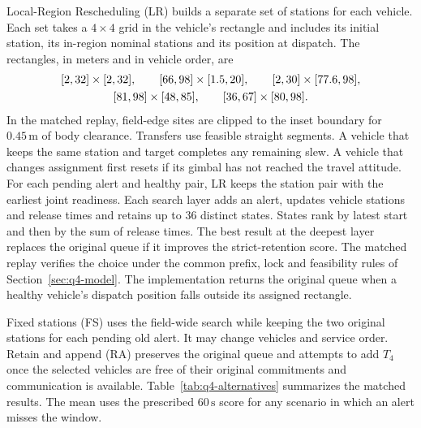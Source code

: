 \documentclass{swmcmthesis}
\begin{document}
Local-Region Rescheduling (LR) builds a separate set of stations for each vehicle. Each set takes a \(4\times4\) grid in the vehicle's rectangle and includes its initial station, its in-region nominal stations and its position at dispatch. The rectangles, in meters and in vehicle order, are
\begin{equation}
\label{eq:q4-local-search-rectangles}
\begin{gathered}
\relax[2,32]\times[2,32],\qquad [66,98]\times[1.5,20],\qquad [2,30]\times[77.6,98],\\
\relax[81,98]\times[48,85],\qquad [36,67]\times[80,98].
\end{gathered}
\end{equation}
In the matched replay, field-edge sites are clipped to the inset boundary for \(0.45\,\mathrm m\) of body clearance. Transfers use feasible straight segments. A vehicle that keeps the same station and target completes any remaining slew. A vehicle that changes assignment first resets if its gimbal has not reached the travel attitude. For each pending alert and healthy pair, LR keeps the station pair with the earliest joint readiness. Each search layer adds an alert, updates vehicle stations and release times and retains up to 36 distinct states. States rank by latest start and then by the sum of release times. The best result at the deepest layer replaces the original queue if it improves the strict-retention score. The matched replay verifies the choice under the common prefix, lock and feasibility rules of Section~\ref{sec:q4-model}. The implementation returns the original queue when a healthy vehicle's dispatch position falls outside its assigned rectangle.

Fixed stations (FS) uses the field-wide search while keeping the two original stations for each pending old alert. It may change vehicles and service order. Retain and append (RA) preserves the original queue and attempts to add \(T_4\) once the selected vehicles are free of their original commitments and communication is available. Table~\ref{tab:q4-alternatives} summarizes the matched results. The mean uses the prescribed \(60\,\mathrm s\) score for any scenario in which an alert misses the window.
\end{document}
